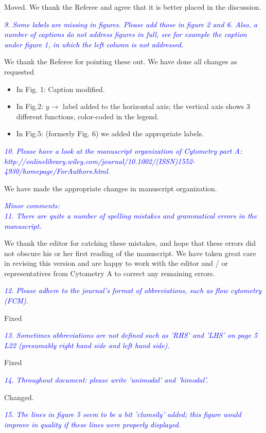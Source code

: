 \documentclass[letter,11pt,draft]{article}
\newcommand{\re}[1]{\emph{\textcolor{blue}{#1}}}
\begin{document}
\smallskip
Moved. We thank the Referee and agree that it is better placed in the discussion.

\re{
9. Some labels are missing in figures. Please add those in figure 2 and 6. Also, a number of captions do not address figures in full, see for example the caption under figure 1, in which the left column is not addressed.}

\smallskip
We thank the Referee for pointing these out. We have done all changes as requested

\smallskip
\begin{itemize}
\item In Fig. 1: Caption  modified.
\item In Fig.2: $y\longrightarrow$ label added to the horizontal axis; the vertical axis shows 3 different functions, color-coded in the legend.
\item In Fig.5: (formerly Fig. 6) we added the appropriate labels.
\end{itemize}

\re{
10. Please have a look at the manuscript organization of Cytometry part A: http://onlinelibrary.wiley.com/journal/10.1002/(ISSN)1552-4930/homepage/ForAuthors.html.
}

\smallskip
We have made the appropriate changes in manuscript organization. 

\smallskip
\re{
Minor comments:
\\
11. There are quite a number of spelling mistakes and grammatical errors in the manuscript.}

\smallskip
We thank the editor for catching these mistakes, and hope that these errors did not obscure his or her first reading of the manuscript. We have taken great care in revising this version and are happy to work with the editor and / or representatives from Cytometry A to correct any remaining errors.

\re{
12. Please adhere to the journal's format of abbreviations, such as flow cytometry (FCM).}

\smallskip
Fixed

\re{
13. Sometimes abbreviations are not defined such as 'RHS' and 'LHS' on page 5 L22 (presumably right hand side and left hand side).}

\smallskip
Fixed

\re{
14. Throughout document: please write 'unimodal' and 'bimodal'.
}

\smallskip
Changed.

\re{
15. The lines in figure 5 seem to be a bit 'clumsily' added; this figure would improve in quality if these lines were properly displayed.
}
\end{document}

